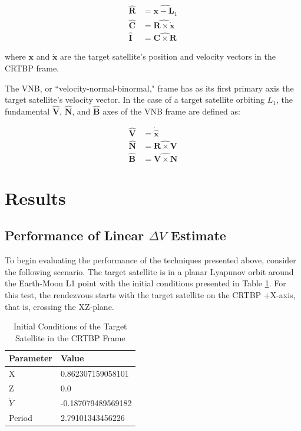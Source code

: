 \documentclass[]{article}
\begin{document}
\begin{equation} \label{eq:RIC}
\begin{aligned}
\mathbf{\hat{R}} &= \widehat{\mathbf{x} - \mathbf{L}_1} \\
\mathbf{\hat{C}} &= \widehat{\mathbf{R} \times \mathbf{\dot{x}}} \\
\mathbf{\hat{I}} \, &= \widehat{\mathbf{C} \times \mathbf{R}}
\end{aligned}
\end{equation}

where \(\mathbf{x}\) and \(\mathbf{\dot{x}}\) are the target satellite's position and velocity vectors in the CRTBP frame.

The VNB, or ``velocity-normal-binormal," frame has as its first primary axis the target satellite's velocity vector.  In the case of a target satellite orbiting \(L_1\), the fundamental \(\mathbf{\hat{V}}\), \(\mathbf{\hat{N}}\), and \(\mathbf{\hat{B}}\) axes of the VNB frame are defined as:

\begin{equation} \label{eq:VNB}
\begin{aligned}
\mathbf{\hat{V}} &= \mathbf{\dot{\hat{x}}} \\
\mathbf{\hat{N}} &= \widehat{\mathbf{R} \times \mathbf{V}}  \\
\mathbf{\hat{B}} &= \widehat{\mathbf{V} \times \mathbf{N}} 
\end{aligned}
\end{equation}

\section{Results}

\subsection{Performance of Linear \(\Delta V\) Estimate}

To begin evaluating the performance of the techniques presented above, consider the following scenario.  The target satellite is in a planar Lyapunov orbit around the Earth-Moon L1 point with the initial conditions presented in Table \ref{tab:IC_1}.  For this test, the rendezvous starts with the target satellite on the CRTBP +X-axis, that is, crossing the XZ-plane.

\begin{table}[h] \label{tab:IC_1}
	\begin{center}
		\begin{tabular}{l l}
			\toprule
			Parameter   & Value \\
			\midrule
			X                & 0.862307159058101 \\
			Z                & 0.0 \\
			\(\dot{Y}\) & -0.187079489569182 \\
			Period        & 2.79101343456226 \\
			\bottomrule
		\end{tabular}
		\caption{Initial Conditions of the Target Satellite in the CRTBP Frame}
	\end{center}
\end{table}
\end{document}
